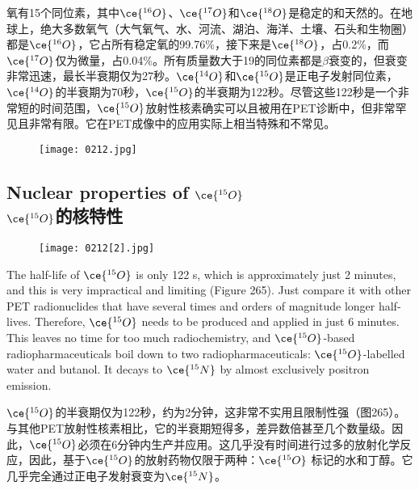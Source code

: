\documentclass[dvipsnames, svgnames,a4paper,11pt]{article}
\begin{document}
氧有15个同位素，其中\(\ce{^{16}O}\)、\(\ce{^{17}O}\)和\(\ce{^{18}O}\)是稳定的和天然的。在地球上，绝大多数氧气（大气氧气、水、河流、湖泊、海洋、土壤、石头和生物圈）都是\(\ce{^{16}O}\)，它占所有稳定氧的99.76\%，接下来是\(\ce{^{18}O}\)，占0.2\%，而\(\ce{^{17}O}\)仅为微量，占0.04\%。所有质量数大于19的同位素都是\(\beta\)衰变的，但衰变非常迅速，最长半衰期仅为27秒。\(\ce{^{14}O}\)和\(\ce{^{15}O}\)是正电子发射同位素，\(\ce{^{14}O}\)的半衰期为70秒，\(\ce{^{15}O}\)的半衰期为122秒。尽管这些122秒是一个非常短的时间范围，\(\ce{^{15}O}\)放射性核素确实可以且被用在PET诊断中，但非常罕见且非常有限。它在PET成像中的应用实际上相当特殊和不常见。

\begin{figure}[h]
	\centering
    \texttt{[image: 0212.jpg]}  
     \label{fig264}
\end{figure}

\subsection{Nuclear properties of \(\ce{^{15}O}\)\\ \(\ce{^{15}O}\)的核特性}  

\begin{figure}[h]
	\centering
    \texttt{[image: 0212[2].jpg]}  
     \label{fig265}
\end{figure}

The half-life of \(\ce{^{15}O}\) is only 122 s, which is approximately just 2 minutes, and this is very impractical and limiting (Figure 265). Just compare it with other PET radionuclides that have several times and orders of magnitude longer half-lives. Therefore, \(\ce{^{15}O}\) needs to be produced and applied in just 6 minutes. This leaves no time for too much radiochemistry, and \(\ce{^{15}O}\)-based radiopharmaceuticals boil down to two radiopharmaceuticals: \(\ce{^{15}O}\)-labelled water and butanol. It decays to \(\ce{^{15}N}\) by almost exclusively positron emission.

\(\ce{^{15}O}\)的半衰期仅为122秒，约为2分钟，这非常不实用且限制性强（图265）。与其他PET放射性核素相比，它的半衰期短得多，差异数倍甚至几个数量级。因此，\(\ce{^{15}O}\)必须在6分钟内生产并应用。这几乎没有时间进行过多的放射化学反应，因此，基于\(\ce{^{15}O}\)的放射药物仅限于两种：\(\ce{^{15}O}\) 标记的水和丁醇。它几乎完全通过正电子发射衰变为\(\ce{^{15}N}\)。
\end{document}
